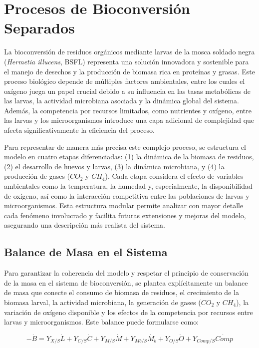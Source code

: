 \section{Procesos de Bioconversión Separados}

La bioconversión de residuos orgánicos mediante larvas de la mosca soldado negra (\textit{Hermetia illucens}, BSFL) representa una solución innovadora y sostenible para el manejo de desechos y la producción de biomasa rica en proteínas y grasas. Este proceso biológico depende de múltiples factores ambientales, entre los cuales el oxígeno juega un papel crucial debido a su influencia en las tasas metabólicas de las larvas, la actividad microbiana asociada y la dinámica global del sistema. Además, la competencia por recursos limitados, como nutrientes y oxígeno, entre las larvas y los microorganismos introduce una capa adicional de complejidad que afecta significativamente la eficiencia del proceso.

Para representar de manera más precisa este complejo proceso, se estructura el modelo en cuatro etapas diferenciadas: (1) la dinámica de la biomasa de residuos, (2) el desarrollo de huevos y larvas, (3) la dinámica microbiana, y (4) la producción de gases ($CO_2$ y $CH_4$). Cada etapa considera el efecto de variables ambientales como la temperatura, la humedad y, especialmente, la disponibilidad de oxígeno, así como la interacción competitiva entre las poblaciones de larvas y microorganismos. Esta estructura modular permite analizar con mayor detalle cada fenómeno involucrado y facilita futuras extensiones y mejoras del modelo, asegurando una descripción más realista del sistema.

\subsection{Balance de Masa en el Sistema}

Para garantizar la coherencia del modelo y respetar el principio de conservación de la masa en el sistema de bioconversión, se plantea explícitamente un balance de masa que conecte el consumo de biomasa de residuos, el crecimiento de la biomasa larval, la actividad microbiana, la generación de gases ($CO_2$ y $CH_4$), la variación de oxígeno disponible y los efectos de la competencia por recursos entre larvas y microorganismos. Este balance puede formularse como:

\begin{equation}
-\dot{B} = Y_{X/S} \dot{L} + Y_{C/S} \dot{C} + Y_{M/S} \dot{M} + Y_{Mb/S} \dot{M_b} + Y_{O/S} \dot{O} + Y_{Comp/S} \dot{Comp}
\end{equation}

